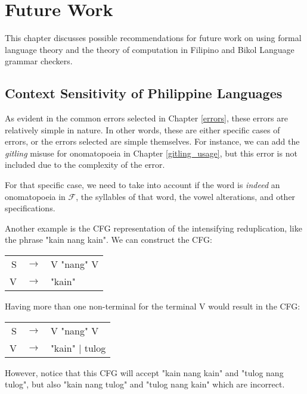 \chapter{Future Work}
\label{future_work}

This chapter discusses possible recommendations for future work on using formal language theory and the theory of computation in Filipino and Bikol Language grammar checkers.

\section{Context Sensitivity of Philippine Languages}

As evident in the common errors selected in Chapter \ref{errors}, these errors are relatively simple in nature. In other words, these are either specific cases of errors, or the errors selected are simple themselves. For instance, we can add the \textit{gitling} misuse for onomatopoeia in Chapter \ref{gitling_usage}, but this error is not included due to the complexity of the error.

 For that specific case, we need to take into account if the word is \textit{indeed} an onomatopoeia in $\mathcal{F}$, the syllables of that word, the vowel alterations, and other specifications.

 Another example is the CFG representation of the intensifying reduplication, like the phrase "kain nang kain". We can construct the CFG:

 \begin{center}
     \begin{tabular}{rcl}
         S & $\to$ &  V "nang" V \\ 
         V & $\to$ & "kain"
     \end{tabular}
 \end{center}

Having more than one non-terminal for the terminal V would result in the CFG:


 \begin{center}
     \begin{tabular}{rcl}
          S & $\to$ & V "nang" V \\
          V & $\to$ & "kain" | tulog
     \end{tabular}
 \end{center}

However, notice that this CFG will accept "kain nang kain" and "tulog nang tulog", but also "kain nang tulog" and "tulog nang kain" which are incorrect.

